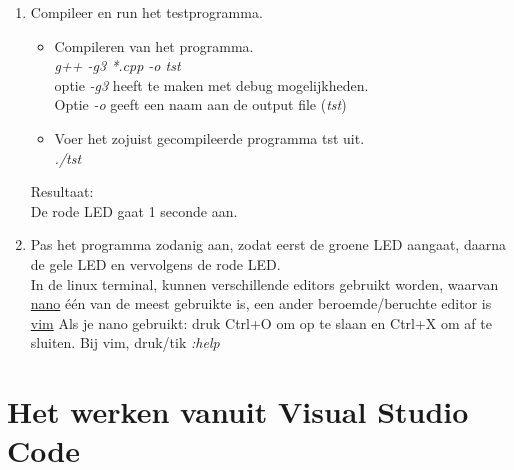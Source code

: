 \begin{enumerate}
\begin{lstlisting}[caption=Zet LED aan en uit,frame=tlrb,label={lst:mainLd}]{Name}
#include <unistd.h>
#include <iostream>
#include "gpiofuncties.h"
	
using namespace std;
#define RODELED 135
	
int main() {
		
	cout<<"Hi NSE"<<endl;
	int b=zetPinOpOutput(RODELED);//return waarde of het gelukt is.
	if(b == 0)  {  //if(!b) mag ook. 
		cout<<"Foutje bedankt"<<endl;
		return 0;
	}
	cout<<"b= "<<b<<endl;//return waarde of het gelukt is.
	b=zetPinWaarde(RODELED,1);  //Zet de rode LED aan.
	usleep(1000000);
	b=zetPinWaarde(RODELED,0);  //Zet de rode LED uit.
	cout<<"einde"<<endl;
}
\end{lstlisting}
   \item Compileer en run het testprogramma.
\begin{itemize}
	\item Compileren van het programma. \\\textit{g++ -g3 *.cpp -o tst}\\
	optie \textit{-g3} heeft te maken met debug mogelijkheden. \\
	Optie \textit{-o} geeft een naam aan de output file (\textit{tst})
	\item Voer het zojuist gecompileerde programma tst uit.\\\textit{./tst}  
	
\end{itemize}
Resultaat:\\	
De rode LED gaat 1 seconde aan.

\item Pas het programma zodanig aan, zodat eerst de groene LED aangaat, daarna de gele LED en vervolgens de rode LED. \\
In de linux terminal, kunnen verschillende editors gebruikt worden, waarvan \href{https://linuxize.com/post/how-to-use-nano-text-editor/}{nano} \'{e}\'{e}n van de meest gebruikte is, een ander beroemde/beruchte editor is \href{https://opensource.com/article/19/3/getting-started-vim}{vim}  
Als je nano gebruikt: druk Ctrl+O om op te slaan en Ctrl+X om af te sluiten. Bij vim, druk/tik \textit{:help}
\end{enumerate}

\section{Het werken vanuit Visual Studio Code}

